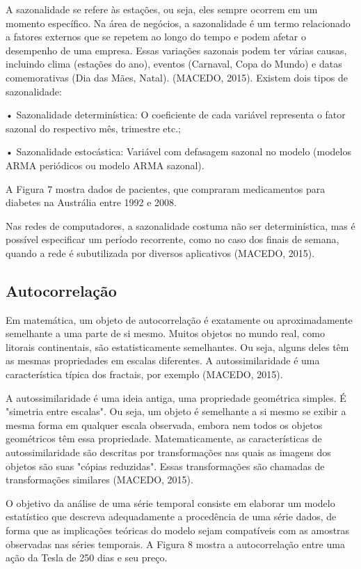 \documentclass[
	12pt,				%
	openright,			%
	twoside,			%
	a4paper,			%
	english,			%
	french,				%
	spanish,			%
	brazil				%
	]{abntex2}
\begin{document}
A sazonalidade se refere às estações, ou seja, eles sempre ocorrem em um momento específico. Na área de negócios, a sazonalidade é um termo relacionado a fatores externos que se repetem ao longo do tempo e podem afetar o desempenho de uma empresa. Essas variações sazonais podem ter várias causas, incluindo clima (estações do ano), eventos (Carnaval, Copa do Mundo) e datas comemorativas (Dia das Mães, Natal). (MACEDO, 2015). Existem dois tipos de sazonalidade:

•	Sazonalidade determinística: O coeficiente de cada variável representa o fator sazonal do respectivo mês, trimestre etc.;

•	Sazonalidade estocástica: Variável com defasagem sazonal no modelo (modelos ARMA periódicos ou modelo ARMA sazonal).

A Figura 7 mostra dados de pacientes, que compraram medicamentos para diabetes na Austrália entre 1992 e 2008.

Nas redes de computadores, a sazonalidade costuma não ser determinística, mas é possível especificar um período recorrente, como no caso dos finais de semana, quando a rede é subutilizada por diversos aplicativos (MACEDO, 2015).

\subsection{Autocorrelação}

Em matemática, um objeto de autocorrelação é exatamente ou aproximadamente semelhante a uma parte de si mesmo. Muitos objetos no mundo real, como litorais continentais, são estatisticamente semelhantes. Ou seja, alguns deles têm as mesmas propriedades em escalas diferentes. A autossimilaridade é uma característica típica dos fractais, por exemplo (MACEDO, 2015).

A autossimilaridade é uma ideia antiga, uma propriedade geométrica simples. É "simetria entre escalas". Ou seja, um objeto é semelhante a si mesmo se exibir a mesma forma em qualquer escala observada, embora nem todos os objetos geométricos têm essa propriedade. Matematicamente, as características de autossimilaridade são descritas por transformações nas quais as imagens dos objetos são suas "cópias reduzidas". Essas transformações são chamadas de transformações similares (MACEDO, 2015).

O objetivo da análise de uma série temporal consiste em elaborar um modelo estatístico que descreva adequadamente a procedência de uma série dados, de forma que as implicações teóricas do modelo sejam compatíveis com as amostras observadas nas séries temporais. A Figura 8 mostra a autocorrelação entre uma ação da Tesla de 250 dias e seu preço.
\end{document}
